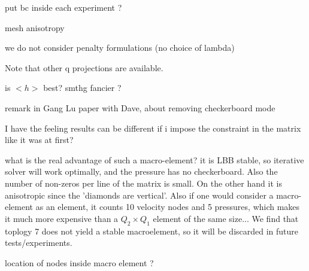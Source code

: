 put bc inside each experiment ?

mesh anisotropy

we do not consider penalty formulations (no choice of lambda)

Note that other q projections are available.

is $<h>$ best? smthg fancier ?

remark in Gang Lu paper with Dave, about removing checkerboard mode


I have the feeling results can be different if i impose the
constraint in the matrix like it was at first?


what is the real advantage of such a macro-element? it is LBB stable, so 
iterative solver will work optimally, and the pressure has no checkerboard.
Also the number of non-zeros per line of the matrix is small.  
On the other hand it is anisotropic since the 'diamonds are vertical'. 
Also if one would consider a macro-element as an element, it counts 10 velocity nodes and 5 pressures, 
which makes it much more expensive than a $Q_2\times Q_1$ element of the same size...
We find that toplogy 7 does not yield a stable macroelement, so it will be discarded in 
future tests/experiments.

location of nodes inside macro element ?


